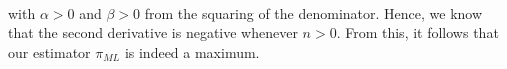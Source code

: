 \documentclass{article}
\newcommand{\piml}{\ensuremath{\pi_{ML}}}
\begin{document}
{\begin{align*}
\end{align*}
with $\alpha > 0$ and $\beta > 0$ from the squaring of the denominator. Hence, we know that the second derivative is negative whenever $n > 0$.
From this, it follows that our estimator $\piml$ is indeed a maximum.


}
\end{document}
